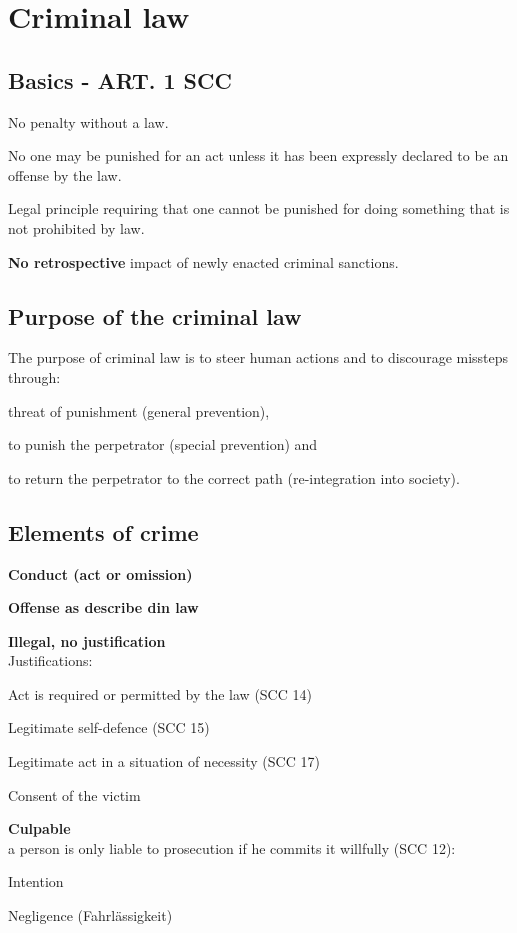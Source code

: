 \section{Criminal law}
\subsection{Basics - ART. 1 SCC}
\begin{compactitem}
	\item No penalty without a law.
	\item No one may be punished for an act unless it has been expressly declared to be an offense by the law.
	\item Legal principle requiring that one cannot be punished for doing something	that is not prohibited by law.
	\item \textbf{No retrospective} impact of newly enacted criminal sanctions.
\end{compactitem}

\subsection{Purpose of the criminal law}
The purpose of criminal law is to steer human actions and to discourage missteps through:
\begin{compactitem}
	\item threat of punishment (general prevention),
	\item to punish the perpetrator (special prevention) and
	\item to return the perpetrator to the correct path (re-integration into society).
\end{compactitem}

\subsection{Elements of crime}
\begin{compactenum}
	\item \textbf{Conduct (act or omission)}
	\item \textbf{Offense as describe din law}
	\item \textbf{Illegal, no justification} \\
		Justifications:
		\begin{compactitem}
			\item Act is required or permitted by the law (SCC 14)
			\item Legitimate self-defence (SCC 15)
			\item Legitimate act in a situation of necessity (SCC 17)
			\item Consent of the victim
		\end{compactitem}
	\item \textbf{Culpable}\\
		a person is only liable to prosecution if he commits it willfully (SCC 12):
		\begin{compactitem}
			\item Intention
			\item Negligence (Fahrlässigkeit)
		\end{compactitem}
\end{compactenum}

